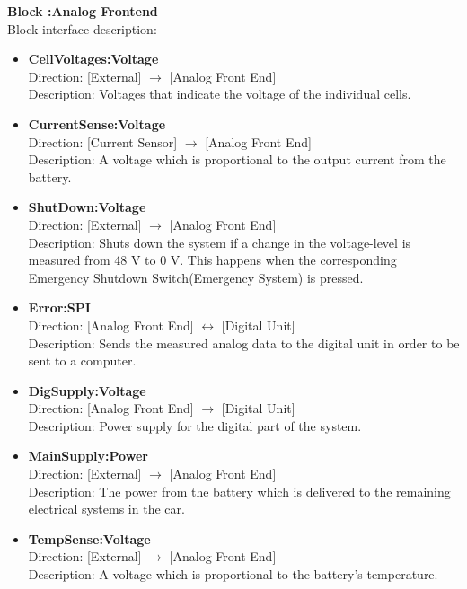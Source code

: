 \textbf{Block :Analog Frontend}\\
Block interface description:
\begin{itemize}
	\item \textbf{CellVoltages:Voltage}\\
	Direction: [External] $\rightarrow$ [Analog Front End]\\
	Description: Voltages that indicate the voltage of the individual cells.
	\item \textbf{CurrentSense:Voltage}\\
	Direction: [Current Sensor] $\rightarrow$ [Analog Front End]\\
	Description: A voltage which is proportional to the output current from the battery.
	\item \textbf{ShutDown:Voltage}\\
	Direction: [External] $\rightarrow$ [Analog Front End]\\
	Description: Shuts down the system if a change in the voltage-level is measured from 48 V to 0 V. This happens when the corresponding Emergency Shutdown Switch(Emergency System) is pressed.
	\item \textbf{Error:SPI}\\
	Direction: [Analog Front End] $\leftrightarrow$ [Digital Unit]\\
	Description: Sends the measured analog data to the digital unit in order to be sent to a computer.
	\item \textbf{DigSupply:Voltage}\\
	Direction: [Analog Front End] $\rightarrow$ [Digital Unit]\\
	Description: Power supply for the digital part of the system.
	\item \textbf{MainSupply:Power}\\
	Direction: [External] $\rightarrow$ [Analog Front End]\\
	Description: The power from the battery which is delivered to the remaining electrical systems in the car.
	\item \textbf{TempSense:Voltage}\\
	Direction: [External] $\rightarrow$ [Analog Front End]\\
	Description: A voltage which is proportional to the battery's temperature.
\end{itemize}

